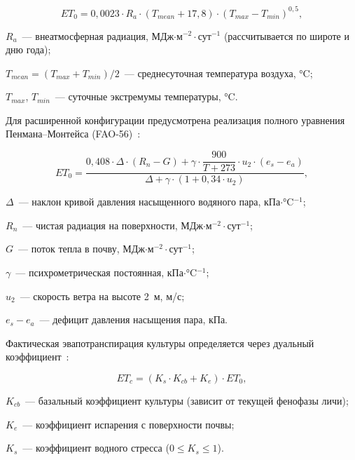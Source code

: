 \begin{equation}
	ET_{0} = 0{,}0023 \cdot R_a \cdot (T_{mean} + 17{,}8) \cdot (T_{max} - T_{min})^{0{,}5},
	\label{eq:hargreaves}
\end{equation}

\begin{where}
	\item $R_a$~--- внеатмосферная радиация, МДж$\cdot$м$^{-2}\cdot$сут$^{-1}$ (рассчитывается по широте и дню года);
	\item $T_{mean} = (T_{max} + T_{min}) / 2$~--- среднесуточная температура воздуха, °C;
	\item $T_{max}$, $T_{min}$~--- суточные экстремумы температуры, °C.
\end{where}

Для расширенной конфигурации предусмотрена реализация полного
уравнения Пенмана--Монтейса (FAO-56)~\cite{allen1998_fao56,
	zotarelli2010_step_by_step}:

\begin{equation}
	ET_0 = \frac{0{,}408 \cdot \Delta \cdot (R_n - G) + \gamma \cdot \dfrac{900}{T + 273} \cdot u_2 \cdot (e_s - e_a)}{\Delta + \gamma \cdot (1 + 0{,}34 \cdot u_2)},
	\label{eq:penman_monteith}
\end{equation}

\begin{where}
	\item $\Delta$~--- наклон кривой давления насыщенного водяного пара, кПа$\cdot$°C$^{-1}$;
	\item $R_n$~--- чистая радиация на поверхности, МДж$\cdot$м$^{-2}\cdot$сут$^{-1}$;
	\item $G$~--- поток тепла в почву, МДж$\cdot$м$^{-2}\cdot$сут$^{-1}$;
	\item $\gamma$~--- психрометрическая постоянная, кПа$\cdot$°C$^{-1}$;
	\item $u_2$~--- скорость ветра на высоте 2~м, м/с;
	\item $e_s - e_a$~--- дефицит давления насыщения пара, кПа.
\end{where}

Фактическая эвапотранспирация культуры определяется через дуальный
коэффициент~\cite{allen2005_dual_kc}:

\begin{equation}
	ET_c = (K_s \cdot K_{cb} + K_e) \cdot ET_0,
	\label{eq:dual_kc}
\end{equation}

\begin{where}
	\item $K_{cb}$~--- базальный коэффициент культуры (зависит от текущей фенофазы личи);
	\item $K_e$~--- коэффициент испарения с поверхности почвы;
	\item $K_s$~--- коэффициент водного стресса ($0 \leq K_s \leq 1$).
\end{where}

